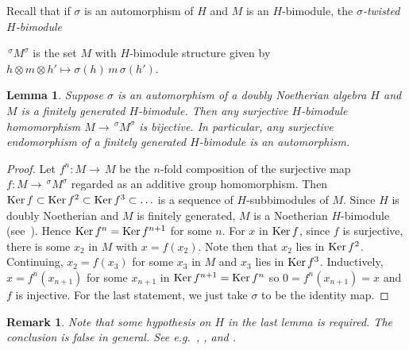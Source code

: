\documentclass[11pt]{amsart}
\numberwithin{equation}{section}
\newtheorem{lemma}[equation]{Lemma}
\newtheorem{remark}[equation]{Remark}
\newcommand{\s}{\sigma}
\renewcommand{\_}[1]{\mbox{$_{\left( #1 \right)}$}}
\renewcommand{\ker}{\mbox{\rm Ker\,}}
\newcommand{\ot}{\otimes}
\begin{document}
Recall that if $\s$ is an automorphism of $H$ and $M$ is an
$H$-bimodule,
the {\em $\s$-twisted $H$-bimodule} { $\, ^{\s\!}M^{\s}$ is the set $M$ with
  $H$-bimodule structure given by
  $h\ot m\ot h'\mapsto \s(h)\, m\, \s(h')$.
\begin{lemma}\label{NoetherianImpliesHopfian}
  Suppose $\s$ is an automorphism of a doubly Noetherian algebra $H$
  and $M$ is a finitely generated $H$-bimodule.
  Then any surjective $H$-bimodule
  homomorphism $M\rightarrow \, ^{\s\!}M^{\s}$ 
  is bijective.  In particular, any surjective endomorphism of a finitely
  generated $H$-bimodule is an automorphism.
\end{lemma}
\begin{proof}
Let
  $f^n:M\rightarrow \, M$ be the $n$-fold
  composition of the surjective map
  $f:M\rightarrow \, ^{\s \!}M^{\s}$ regarded as an additive group homomorphism.
 Then $\ker f\subset \ker  
f^2\subset \ker f^3\subset \ldots$ is a sequence of $H$-subbimodules of $M$.
Since $H$ is doubly Noetherian and $M$ is finitely generated, 
$M$ is a Noetherian $H$-bimodule
(see~\cite[Corollary~1.4]{GoodearlWarfield}).
Hence
$\ker f^n = \ker f^{n+1}$ for some $n$.
For $x$ in $\ker f$, since $f$ is surjective,
there is some $x_2$ in $M$ with $x=f(x_2)$.
Note then that $x_2$ lies in $\ker f^2$.
Continuing, $x_2=f(x_3)$ for some $x_3$ in $M$ and $x_3$ lies in $\ker f^3$.
 Inductively, $x=f^{n}(x_{n+1})$ for some $x_{n+1}$ in $\ker f^{n+1}=\ker f^{n}$
 so $0=f^{n}(x_{n+1})=x$ and $f$ is injective.
 For the last statement, we just take $\s$ to be the identity map.
  \end{proof}

 \begin{remark}\label{rk:khare}
   {\em 
     Note that some hypothesis on $H$ in the last lemma is required.
The conclusion is false in general. 
See e.g.~\cite{Shepherdson}, \cite{Montgomery1983}, and
      \cite[Section~1, Exercise 18]{Lam1999}.
    }
    \end{remark}

}
\end{document}
